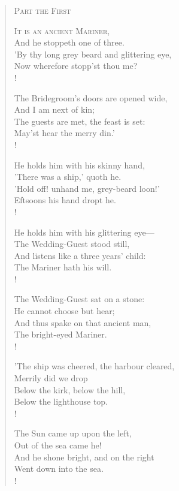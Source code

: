 \documentclass[11pt,twoside]{book}
\begin{document}
\begin{verse}

\vspace*{0.8in}

\begin{center}
\textsc{Part the First}
\end{center}

\bigskip
\bigskip

\lettrine{I}{t is an ancient Mariner,} \\
And he stoppeth one of three. \\
'By thy long grey beard and glittering eye, \\
Now wherefore stopp'st thou me? \\!

The Bridegroom's doors are opened wide, \\
And I am next of kin; \\
The guests are met, the feast is set: \\
May'st hear the merry din.' \\!

He holds him with his skinny hand, \\
'There was a ship,' quoth he. \\
'Hold off! unhand me, grey-beard loon!' \\
Eftsoons his hand dropt he. \\!

He holds him with his glittering eye— \\
The Wedding-Guest stood still, \\
And listens like a three years' child: \\
The Mariner hath his will. \\!

The Wedding-Guest sat on a stone: \\
He cannot choose but hear; \\
And thus spake on that ancient man, \\
The bright-eyed Mariner. \\!

'The ship was cheered, the harbour cleared, \\
Merrily did we drop \\
Below the kirk, below the hill, \\
Below the lighthouse top. \\!

The Sun came up upon the left, \\
Out of the sea came he! \\
And he shone bright, and on the right \\
Went down into the sea. \\!


\end{verse}
\end{document}
